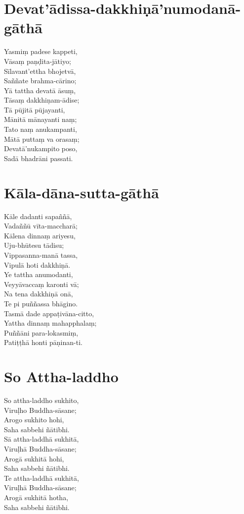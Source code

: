\chapter{Devat'ādissa-dakkhiṇā'numodanā-gāthā}

Yasmiṃ padese kappeti,\\
Vāsaṃ paṇḍita-jātiyo;\\
Sīlavant'ettha bhojetvā,\\
Saññate brahma-cārino;\\
Yā tattha devatā āsuṃ,\\
Tāsaṃ dakkhiṇam-ādise;\\
Tā pūjitā pūjayanti,\\
Mānitā mānayanti naṃ;\\
Tato naṃ anukampanti,\\
Mātā puttaṃ va orasaṃ;\\
Devatā'nukampito poso,\\
Sadā bhadrāni passati.

\chapter{Kāla-dāna-sutta-gāthā}

Kāle dadanti sapaññā,\\
Vadaññū vīta-maccharā;\\
Kālena dinnaṃ ariyesu,\\
Uju-bhūtesu tādisu;\\
Vippasanna-manā tassa,\\
Vipulā hoti dakkhiṇā.\\
Ye tattha anumodanti,\\
Veyyāvaccaṃ karonti vā;\\
Na tena dakkhiṇā onā,\\
Te pi puññassa bhāgino.\\
Tasmā dade appaṭivāna-citto,\\
Yattha dinnaṃ mahapphalaṃ;\\
Puññāni para-lokasmiṃ,\\
Patiṭṭhā honti pāṇinan-ti.

\chapter{So Attha-laddho}

So attha-laddho sukhito,\\
Viruḷho Buddha-sāsane;\\
Arogo sukhito hohi,\\
Saha sabbehi ñātibhi.\\
Sā attha-laddhā sukhitā,\\
Viruḷhā Buddha-sāsane;\\
Arogā sukhitā hohi,\\
Saha sabbehi ñātibhi.\\
Te attha-laddhā sukhitā,\\
Viruḷhā Buddha-sāsane;\\
Arogā sukhitā hotha,\\
Saha sabbehi ñātibhi.

